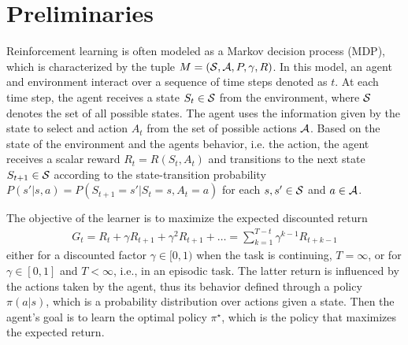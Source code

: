 \section{Preliminaries}
Reinforcement learning is often modeled as a Markov decision process (MDP), which is characterized by the tuple $M = (\mathcal{S}, \mathcal{A}, P, \gamma, R)$. In this model, an agent and environment interact over a sequence of time steps denoted as $t$. At each time step, the agent receives a state $S_t \in \mathcal{S}$ from the environment, where $\mathcal{S}$ denotes the set of all possible states. The agent uses the information given by the state to select and action $A_t$ from the set of possible actions $\mathcal{A}$. Based on the state of the environment and the agents behavior, i.e. the action, the agent receives a scalar reward $R_t = R(S_t,A_t)$ and transitions to the next state $S_{t+1} \in \mathcal{S}$ according to the state-transition probability $P(s'|s,a) = P(S_{t+1} = s' | S_t = s, A_t = a)$ for each $s,s' \in \mathcal{S}$ and $a \in \mathcal{A}$.

The objective of the learner is to maximize the expected discounted return
\begin{align*}
    G_t = R_{t} + \gamma R_{t+1} + \gamma^2 R_{t+1} + \dots = \sum_{k=1}^{T-t} \gamma^{k-1} R_{t+k-1}
\end{align*}
either for a discounted factor $\gamma \in [0,1)$ when the task is continuing, $T = \infty$, or for $\gamma \in [0,1]$ and $T < \infty$, i.e., in an episodic task. The latter return is influenced by the actions taken by the agent, thus its behavior defined through a policy $\pi (a|s)$, which is a probability distribution over actions given a state. Then the agent's goal is to learn the optimal policy $\pi^\star$, which is the policy that maximizes the expected return.

